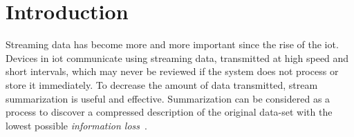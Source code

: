 \section{Introduction}

Streaming data has become more and more important since the rise of the
\acrlong{iot}. Devices in \acrshort{iot} communicate using streaming data,
transmitted at high speed and short intervals, which may never be reviewed if
the system does not process or store it immediately. To decrease the amount of
data transmitted, stream summarization is useful and effective. Summarization
can be considered as a process to discover a compressed description of the
original data-set with the lowest possible \emph{information
loss}~\cite{chandola2007summarization}.

